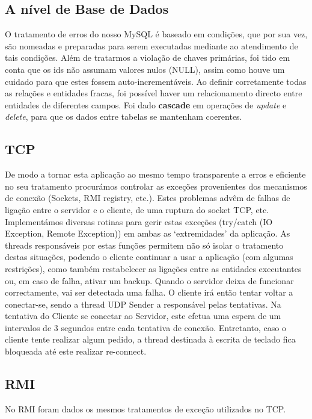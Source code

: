 \documentclass[12pt]{article} %
\begin{document}
\subsection{A nível de Base de Dados}
O tratamento de erros do nosso MySQL é baseado em condições, que por sua vez, são nomeadas e preparadas para serem executadas mediante ao atendimento de tais condições. 
Além de tratarmos a violação de chaves primárias, foi tido em conta que os ids não assumam valores nulos (NULL), assim como houve um cuidado para que estes fossem auto-incrementáveis. Ao definir corretamente todas as relações e entidades fracas, foi possível haver um relacionamento directo entre entidades de diferentes campos. Foi dado \textbf{cascade} em operações de \emph{update} e \emph{delete}, para que os dados entre tabelas se mantenham coerentes. 


\subsection{TCP}
De modo a tornar esta aplicação ao mesmo tempo transparente a erros e eficiente no seu tratamento procurámos controlar as exceções provenientes dos mecanismos de conexão (Sockets, RMI registry, etc.). Estes problemas advêm de falhas de ligação entre o servidor e o cliente, de uma ruptura do socket TCP, etc.
Implementámos diversas rotinas para gerir estas exceções (try/catch (IO Exception, Remote Exception)) em ambas as ‘extremidades’ da aplicação. As threads responsáveis por estas funções  permitem não só isolar o tratamento destas situações, podendo o cliente continuar a usar a aplicação (com algumas restrições), como também restabelecer as ligações entre as entidades executantes ou, em caso de falha, ativar um backup. 
Quando o servidor deixa de funcionar correctamente, vai ser detectada uma falha. O cliente irá então tentar voltar a conectar-se, sendo a thread UDP Sender a responsável pelas tentativas.
Na tentativa do Cliente se conectar ao Servidor, este efetua uma espera de um intervalos de 3 segundos entre cada tentativa de conexão. Entretanto, caso o cliente tente realizar algum pedido, a thread destinada à escrita de teclado fica bloqueada até este realizar re-connect.

\subsection{RMI}
No RMI foram dados os mesmos tratamentos de exceção utilizados no TCP.


\pagebreak
\end{document}
